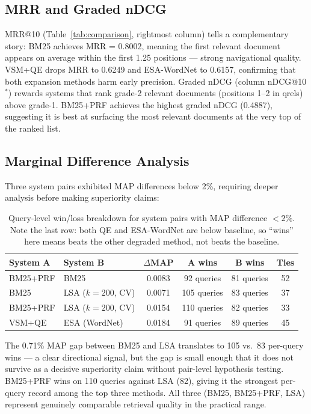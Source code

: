\documentclass{article}
\begin{document}
\subsection{MRR and Graded nDCG}

MRR@10 (Table~\ref{tab:comparison}, rightmost column) tells a complementary story: BM25 achieves MRR = 0.8002, meaning the first relevant document appears on average within the first 1.25 positions --- strong navigational quality. VSM+QE drops MRR to 0.6249 and ESA-WordNet to 0.6157, confirming that both expansion methods harm early precision. Graded nDCG (column nDCG@10$^*$) rewards systems that rank grade-2 relevant documents (positions 1--2 in qrels) above grade-1. BM25+PRF achieves the highest graded nDCG (0.4887), suggesting it is best at surfacing the most relevant documents at the very top of the ranked list.

\subsection{Marginal Difference Analysis}

Three system pairs exhibited MAP differences below 2\%, requiring deeper analysis before making superiority claims:

\begin{table}[H]
\centering
\renewcommand{\arraystretch}{1.2}
\begin{tabular}{llcccc}
\toprule
\textbf{System A} & \textbf{System B} & \textbf{$\Delta$MAP} & \textbf{A wins} & \textbf{B wins} & \textbf{Ties} \\
\midrule
BM25+PRF & BM25            & 0.0083 & 92 queries & 81 queries  & 52 \\
BM25     & LSA ($k{=}200$, CV) & 0.0071 & 105 queries & 83 queries & 37 \\
BM25+PRF & LSA ($k{=}200$, CV) & 0.0154 & 110 queries & 82 queries & 33 \\
VSM+QE   & ESA (WordNet)   & 0.0184 & 91 queries  & 89 queries  & 45 \\
\bottomrule
\end{tabular}
\caption{Query-level win/loss breakdown for system pairs with MAP difference $<2\%$. Note the last row: both QE and ESA-WordNet are below baseline, so ``wins'' here means beats the other degraded method, not beats the baseline.}
\end{table}

The 0.71\% MAP gap between BM25 and LSA translates to 105 vs.\ 83 per-query wins --- a clear directional signal, but the gap is small enough that it does not survive as a decisive superiority claim without pair-level hypothesis testing. BM25+PRF wins on 110 queries against LSA (82), giving it the strongest per-query record among the top three methods. All three (BM25, BM25+PRF, LSA) represent genuinely comparable retrieval quality in the practical range.
\end{document}
